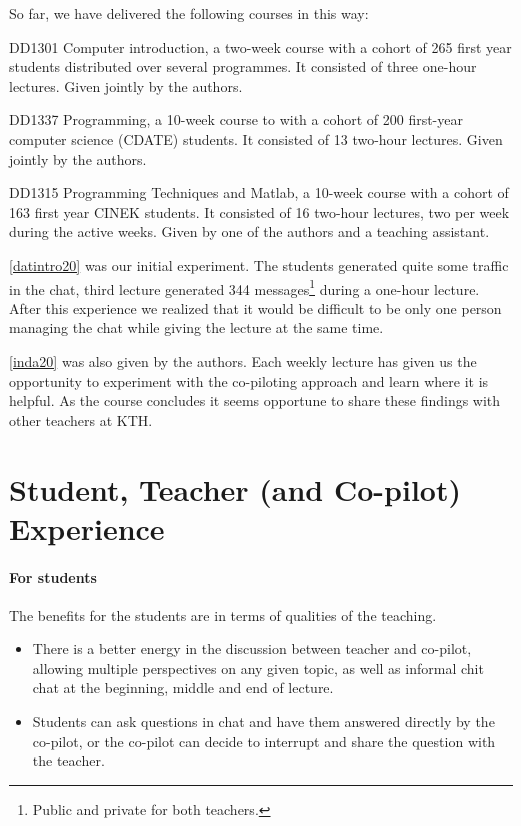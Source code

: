 \documentclass[sigconf]{acmart}
\begin{document}
So far, we have delivered the following courses in this way:
\begin{courses}
  \item\label{datintro20} DD1301 Computer introduction, a two-week course with 
    a cohort of 265 first year students distributed over several programmes.
    It consisted of three one-hour lectures.
    Given jointly by the authors.

  \item\label{inda20} DD1337 Programming, a 10-week course to with a cohort of 
    200 first-year computer science (CDATE) students.
    It consisted of 13 two-hour lectures.
    Given jointly by the authors.

  \item\label{prgi20} DD1315 Programming Techniques and Matlab, a 10-week 
    course with a cohort of 163 first year CINEK students.
    It consisted of 16 two-hour lectures, two per week during the active weeks.
    Given by one of the authors and a teaching assistant.
\end{courses}

\ref{datintro20} was our initial experiment.
The students generated quite some traffic in the chat, \eg third lecture generated
344
messages\footnote{%
  Public and private for both teachers.
} during a one-hour lecture.
After this experience we realized that it would be difficult to be only one 
person managing the chat while giving the lecture at the same time.

\ref{inda20} was also given by the authors.
Each weekly lecture has given us the opportunity to experiment with the 
co-piloting approach and learn where it is helpful.
As the course concludes it seems opportune to share these findings with other 
teachers at KTH.


\section{Student, Teacher (and Co-pilot) Experience}

\paragraph{For students}

The benefits for the students are in terms of qualities of the teaching.

\begin{itemize}
  \item There is a better energy in the discussion between teacher and 
    co-pilot, allowing multiple perspectives on any given topic, as well as 
    informal chit chat at the beginning, middle and end of lecture.

  \item Students can ask questions in chat and have them answered directly by 
    the co-pilot, or the co-pilot can decide to interrupt and share the 
    question with the teacher.
\end{itemize}
\end{document}
